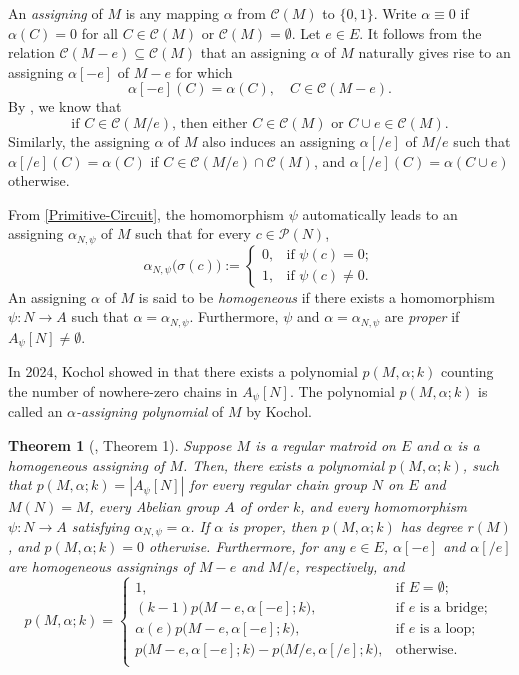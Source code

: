 \documentclass[12pt]{article}%
\numberwithin{equation}{section}
\newtheorem{theorem}{Theorem}[section]
\begin{document}
An {\em assigning} of $M$ is any mapping $\alpha$ from $\mathcal{C}(M)$ to $\{0,1\}$. Write $\alpha\equiv0$ if $\alpha(C)=0$ for all $C\in\mathcal{C}(M)$ or $\mathcal{C}(M)=\emptyset$. Let $e\in E$. It follows from the relation $\mathcal{C}(M-e)\subseteq\mathcal{C}(M)$ that an assigning $\alpha$ of $M$ naturally gives rise to an assigning $\alpha[-e]$ of $M-e$ for which
\[
\alpha[-e](C)=\alpha(C),\quad C\in\mathcal{C}(M-e).
\]
By \cite[Proposition 3.1.10]{Oxley2011}, we know that
\[
\text{if $C\in\mathcal{C}(M/e)$, then either $C\in\mathcal{C}(M)$ or $C\cup e\in\mathcal{C}(M)$.}
\]
Similarly, the assigning $\alpha$ of $M$ also induces an assigning $\alpha[/e]$ of $M/e$ such that $\alpha[/e](C)=\alpha(C)$ if $C\in\mathcal{C}(M/e)\cap\mathcal{C}(M)$, and $\alpha[/e](C)=\alpha(C\cup e)$ otherwise. 

From \eqref{Primitive-Circuit}, the homomorphism $\psi$ automatically leads to an assigning $\alpha_{N,\psi}$ of $M$ such that for every $c\in\mathcal{P}(N)$,
\[  
\alpha_{N,\psi}\big(\sigma(c)\big):=
\begin{cases}
0,& \text{if } \psi(c)=0;\\
1,& \text{if } \psi(c)\ne0.
\end{cases}
\]
An assigning $\alpha$ of $M$ is  said to be {\em homogeneous} if  there exists a homomorphism $\psi:N\to A$ such that $\alpha=\alpha_{N,\psi}$. Furthermore, $\psi$ and $\alpha=\alpha_{N,\psi}$  are {\em proper} if $A_\psi[N]\ne\emptyset$.

In 2024, Kochol showed in \cite[Theorem 1]{Kochol2022} that there exists a polynomial $p(M,\alpha;k)$ counting the number of nowhere-zero chains in $A_\psi[N]$. The polynomial $p(M,\alpha;k)$ is called an {\em $\alpha$-assigning polynomial} of $M$ by Kochol.
\begin{theorem}[\cite{Kochol2024}, Theorem 1]\label{Kochol-Result1} Suppose $M$ is a regular matroid on $E$ and $\alpha$ is a homogeneous assigning of $M$. Then, there exists a polynomial $p(M,\alpha;k)$, such that $p(M,\alpha;k)=|A_{\psi}[N]|$ for every regular chain group $N$ on $E$ and $M(N)=M$, every Abelian group $A$ of order $k$, and every homomorphism $\psi: N\to A$ satisfying $\alpha_{N,\psi}=\alpha$. If $\alpha$ is proper, then $p(M,\alpha;k)$ has degree $r(M)$, and $p(M,\alpha;k)=0$  otherwise. Furthermore, for any $e\in E$, $\alpha[-e]$ and $\alpha[/e]$ are homogeneous assignings of $M-e$ and  $M/e$, respectively, and
\begin{equation*}
p(M,\alpha;k)=
\begin{cases}
1,&\text{if $E=\emptyset$};\\
(k-1)p\big(M-e,\alpha[-e];k\big),&\text{if $e$ is a bridge};\\
\alpha(e)p\big(M-e,\alpha[-e];k\big),&\text{if $e$ is a loop};\\
p\big(M-e,\alpha[-e];k\big)-p\big(M/e,\alpha[/e];k\big),&\text{otherwise}.\\
\end{cases}
\end{equation*}
\end{theorem}
\end{document}
